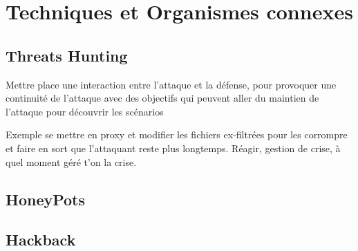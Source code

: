%
%



\section{Techniques et Organismes connexes}

\subsection{Threats Hunting}

Mettre place une interaction entre l'attaque et la défense, pour provoquer une continuité de l'attaque avec des objectifs qui peuvent aller du maintien de l'attaque pour découvrir les scénarios

Exemple se mettre en proxy et modifier les fichiers ex-filtrées pour les corrompre et faire en sort que l'attaquant reste plus longtemps.
Réagir, gestion de crise, à quel moment géré t’on la crise.

\subsection{HoneyPots}

\subsection{Hackback}


